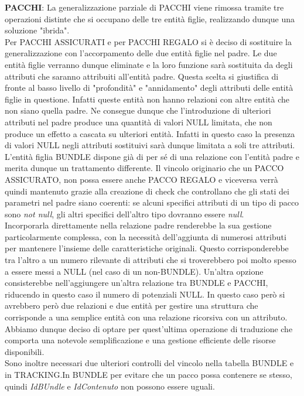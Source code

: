 \textbf{PACCHI}: La generalizzazione parziale di PACCHI viene rimossa tramite tre operazioni distinte che si occupano delle tre entità figlie, realizzando dunque una soluzione "ibrida".\\
Per PACCHI ASSICURATI e per PACCHI REGALO si è deciso di sostituire la generalizzazione con l'accorpamento delle due entità figlie nel padre. Le due entità figlie verranno dunque eliminate e 
la loro funzione sarà sostituita da degli attributi che saranno attribuiti all'entità padre. 
Questa scelta si giustifica di fronte al basso livello di "profondità" e "annidamento" degli attributi delle entità figlie in questione. Infatti queste entità non hanno relazioni con altre entità che non siano quella padre. 
Ne consegue dunque che l'introduzione di ulteriori attributi nel padre produce una quantità di valori NULL limitata, che non produce un effetto a cascata su ulteriori entità. Infatti in questo caso la presenza di valori NULL negli attributi sostituivi sarà dunque limitata a soli tre attributi.\\
L'entità figlia BUNDLE dispone già di per sé di una relazione con l'entità padre e merita dunque un trattamento differente. Il vincolo originario che un PACCO ASSICURATO, non possa essere anche PACCO REGALO e viceversa verrà quindi mantenuto grazie alla creazione di check che controllano che gli stati dei parametri nel padre siano coerenti: se alcuni specifici attributi di un tipo di pacco sono \textit{not null}, gli altri specifici dell'altro tipo dovranno essere \textit{null}.\\
Incorporarla direttamente nella relazione padre renderebbe la sua gestione particolarmente complessa, con la necessità dell'aggiunta di numerosi attributi per mantenere l'insieme delle caratteristiche originali. Questo corrisponderebbe tra l'altro a un numero rilevante di attributi che si troverebbero poi molto spesso a essere messi a NULL (nel caso di un non-BUNDLE). 
Un'altra opzione consisterebbe  nell'aggiungere un'altra relazione tra BUNDLE e PACCHI, riducendo in questo caso il numero di potenziali NULL. In questo caso però si avrebbero però due relazioni e due entità per gestire una struttura che corrisponde a una semplice entità con una relazione ricorsiva con un attributo. Abbiamo dunque deciso di optare per quest'ultima operazione di traduzione che comporta una notevole semplificazione e una gestione efficiente delle risorse disponibili.\\
Sono inoltre necessari due ulteriori controlli del vincolo nella tabella BUNDLE e in TRACKING.In BUNDLE per evitare che un pacco possa contenere se stesso, quindi \textit{IdBUndle} e \textit{IdContenuto} non possono essere uguali.\\
